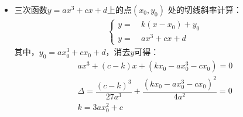 \begin{itemize}[leftmargin=\inteval{\myitemleftmargin}pt,itemsep=
   \inteval{\myitemitempsep}pt,topsep=\inteval{\myitemtopsep}pt]
\item 三次函数$ y =ax^3+cx+d $上的点$ (x_0,y_0) $
处的切线斜率计算：
\begin{align*}
\left\{
\begin{aligned}
    y =&\ k(x-x_0)+y_0  \\
    y =&\ ax^3+cx+d
\end{aligned}
\right. 
\end{align*}
其中，$ y_0=ax_0^3+cx_0+d $，消去$ y $可得：
\begin{gather*}
ax^3+(c-k)x+(kx_0-ax_0^3-cx_0)=0 \\
\Delta=\dfrac{(c-k)^3}{27a^3}+\dfrac{(kx_0-ax_0^3-cx_0)^2}{4a^2}=0 \\
k=3ax_0^2+c
\end{gather*}

\end{itemize}

